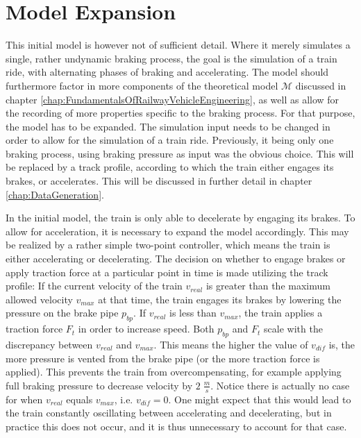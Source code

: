 \section{Model Expansion}
\label{sec:ModelExpansion}

\par\noindent
This initial model is however not of sufficient detail. Where it merely simulates a single, rather undynamic braking process, the goal is the simulation of a train ride, with alternating phases of braking and accelerating. The model should furthermore factor in more components of the theoretical model ${\mathcal{M}}$ discussed in chapter \ref{chap:FundamentalsOfRailwayVehicleEngineering}, as well as allow for the recording of more properties specific to the braking process. For that purpose, the model has to be expanded. The simulation input needs to be changed in order to allow for the simulation of a train ride. Previously, it being only one braking process, using braking pressure as input was the obvious choice. This will be replaced by a track profile, according to which the train either engages its brakes, or accelerates. This will be discussed in further detail in chapter \ref{chap:DataGeneration}.
\par
In the initial model, the train is only able to decelerate by engaging its brakes. To allow for acceleration, it is necessary to expand the model accordingly. This may be realized by a rather simple two-point controller, which means the train is either accelerating or decelerating. The decision on whether to engage brakes or apply traction force at a particular point in time is made utilizing the track profile: If the current velocity of the train $v_{real}$ is greater than the maximum allowed velocity $v_{max}$ at that time, the train engages its brakes by lowering the pressure on the brake pipe $p_{bp}$. If $v_{real}$ is less than $v_{max}$, the train applies a traction force $F_{t}$ in order to increase speed. Both $p_{bp}$ and $F_{t}$ scale with the discrepancy between $v_{real}$ and $v_{max}$. This means the higher the value of $v_{dif}$ is, the more pressure is vented from the brake pipe (or the more traction force is applied). This prevents the train from overcompensating, for example applying full braking pressure to decrease velocity by $2 \; \frac{m}{s}$. Notice there is actually no case for when $v_{real}$ equals $v_{max}$, i.e. $v_{dif} = 0$. One might expect that this would lead to the train constantly oscillating between accelerating and decelerating, but in practice this does not occur, and it is thus unnecessary to account for that case.

